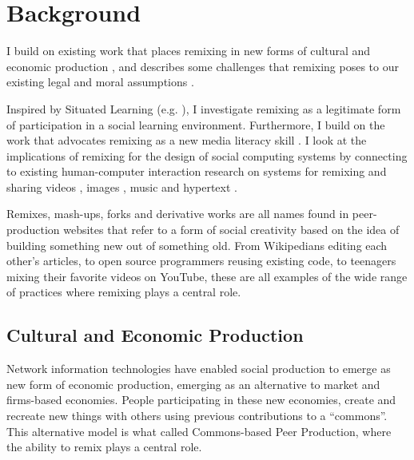 \chapter{Background}


I build on existing work that places remixing in new forms of cultural and economic production \citep{benkler_wealth_2006,jenkins_convergence_2006,manovich_remix_2005,sinnreich_ethics_2009}, and describes some challenges that remixing poses to our existing legal and moral assumptions \citep{lessig_remix:_2008, posner_little_2007}.

Inspired by Situated Learning (e.g. \citet{lave_situated_1991}), I investigate remixing as a legitimate form of participation in a social learning environment.
Furthermore,  I build on the work that advocates remixing as a new media literacy skill \citep{ito_hanging_2010, jenkins_confronting_2009, livingstone_taking_2008, perkel_copy_2008}.
I look at the implications of remixing for the design of social computing systems by connecting to existing human-computer interaction research on systems for remixing and sharing videos \citep{diakopoulos_evolution_2007}, images \citep{seneviratne_policy-aware_2009}, music \citep{cheliotis_analysis_2009} and hypertext \citep{viegas_studying_2004}.

Remixes, mash-ups, forks and derivative works are all names found in peer-production websites that refer to a form of social creativity based on the idea of building something new out of something old.
From Wikipedians editing each other's articles, to open source programmers reusing existing code, to teenagers mixing their favorite videos on YouTube, these are all examples of the wide range of practices where remixing plays a central role.

\section{Cultural and Economic Production}
Network information technologies have enabled social production to emerge as new form of economic production, emerging as an alternative to market and firms-based economies.
People participating in these new economies, create and recreate new things with others using previous contributions to a ``commons''. 
This alternative model is what \citet{benkler_coases_2002} called Commons-based Peer Production, where the ability to remix plays a central role.

